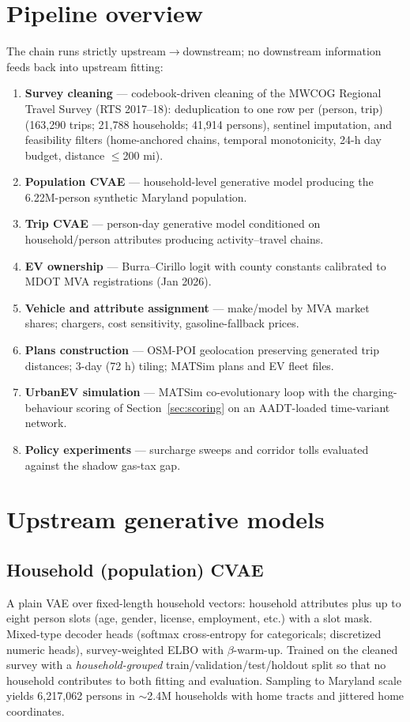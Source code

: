 \documentclass[11pt]{article}
\begin{document}
\section{Pipeline overview}
The chain runs strictly upstream$\rightarrow$downstream; no downstream information
feeds back into upstream fitting:
\begin{enumerate}\itemsep1pt
  \item \textbf{Survey cleaning} — codebook-driven cleaning of the MWCOG Regional
  Travel Survey (RTS 2017--18): deduplication to one row per (person, trip)
  (163{,}290 trips; 21{,}788 households; 41{,}914 persons), sentinel imputation,
  and feasibility filters (home-anchored chains, temporal monotonicity, 24-h day
  budget, distance $\le$200 mi).
  \item \textbf{Population CVAE} — household-level generative model producing the
  6.22M-person synthetic Maryland population.
  \item \textbf{Trip CVAE} — person-day generative model conditioned on
  household/person attributes producing activity--travel chains.
  \item \textbf{EV ownership} — Burra--Cirillo logit with county constants
  calibrated to MDOT MVA registrations (Jan 2026).
  \item \textbf{Vehicle and attribute assignment} — make/model by MVA market
  shares; chargers, cost sensitivity, gasoline-fallback prices.
  \item \textbf{Plans construction} — OSM-POI geolocation preserving generated
  trip distances; 3-day (72 h) tiling; MATSim plans and EV fleet files.
  \item \textbf{UrbanEV simulation} — MATSim co-evolutionary loop with the
  charging-behaviour scoring of Section~\ref{sec:scoring} on an AADT-loaded
  time-variant network.
  \item \textbf{Policy experiments} — surcharge sweeps and corridor tolls
  evaluated against the shadow gas-tax gap.
\end{enumerate}

\section{Upstream generative models}
\subsection{Household (population) CVAE}
A plain VAE over fixed-length household vectors: household attributes plus up to
eight person slots (age, gender, license, employment, etc.) with a slot mask.
Mixed-type decoder heads (softmax cross-entropy for categoricals; discretized
numeric heads), survey-weighted ELBO with $\beta$-warm-up. Trained on the cleaned
survey with a \emph{household-grouped} train/validation/test/holdout split so that
no household contributes to both fitting and evaluation. Sampling to Maryland scale
yields 6{,}217{,}062 persons in $\sim$2.4M households with home tracts and jittered
home coordinates.
\end{document}

